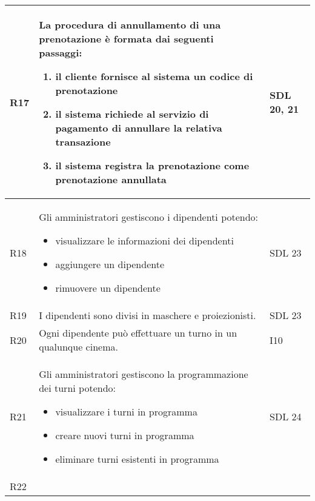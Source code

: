 \begin{longtable}{|p{0.8cm}|p{13.4cm}|p{2.1cm}|}
      R17                                                                     &
      La procedura di annullamento di una prenotazione è formata dai
      seguenti passaggi:
      \begin{enumerate}
            \item il cliente fornisce al sistema un codice di
                  prenotazione
            \item il sistema richiede al servizio di pagamento di
                  annullare la relativa transazione
            \item il sistema registra la prenotazione come prenotazione
                  annullata
      \end{enumerate}             &
      SDL 20, 21
      \\\hline
      R18                                                                     &
      Gli amministratori gestiscono i dipendenti potendo:
      \begin{itemize}
            \item visualizzare le informazioni dei dipendenti
            \item aggiungere un dipendente
            \item rimuovere un dipendente
      \end{itemize}                       &
      SDL 23
      \\\hline
      R19                                                                     &
      I dipendenti sono divisi in maschere e proiezionisti.                   &
      SDL 23
      \\\hline
      R20                                                                     &
      Ogni dipendente può effettuare un turno in un qualunque cinema.         &
      I10
      \\\hline
      R21                                                                     &
      Gli amministratori gestiscono la programmazione dei turni
      potendo:
      \begin{itemize}
            \item visualizzare i turni in programma
            \item creare nuovi turni in programma
            \item eliminare turni esistenti in programma
      \end{itemize}                            &
      SDL 24
      \\\hline
      R22                                                                     &

\end{longtable}
